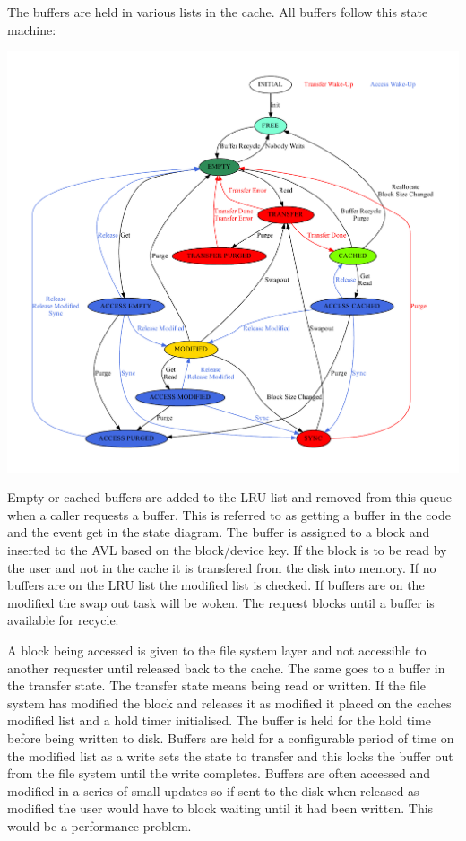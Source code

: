 The buffers are held in various lists in the cache. All buffers follow this state machine\+:


\begin{DoxyImageNoCaption}
  \mbox{\includegraphics[width=\textwidth,height=\textheight/2,keepaspectratio=true]{dot_inline_dotgraph_1}}
\end{DoxyImageNoCaption}


Empty or cached buffers are added to the L\+RU list and removed from this queue when a caller requests a buffer. This is referred to as getting a buffer in the code and the event get in the state diagram. The buffer is assigned to a block and inserted to the A\+VL based on the block/device key. If the block is to be read by the user and not in the cache it is transfered from the disk into memory. If no buffers are on the L\+RU list the modified list is checked. If buffers are on the modified the swap out task will be woken. The request blocks until a buffer is available for recycle.

A block being accessed is given to the file system layer and not accessible to another requester until released back to the cache. The same goes to a buffer in the transfer state. The transfer state means being read or written. If the file system has modified the block and releases it as modified it placed on the cache\textquotesingle{}s modified list and a hold timer initialised. The buffer is held for the hold time before being written to disk. Buffers are held for a configurable period of time on the modified list as a write sets the state to transfer and this locks the buffer out from the file system until the write completes. Buffers are often accessed and modified in a series of small updates so if sent to the disk when released as modified the user would have to block waiting until it had been written. This would be a performance problem.

